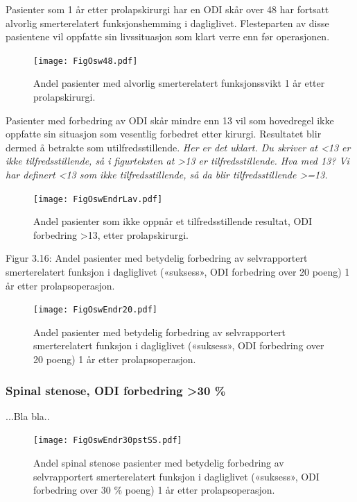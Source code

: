 \documentclass [norsk,a4paper,twoside]{article}\usepackage[]{graphicx}\usepackage[]{color}
\begin{document}

Pasienter som 1 år etter prolapskirurgi har en ODI skår over 48 har fortsatt alvorlig
smerterelatert funksjonshemming i dagliglivet. Flesteparten av disse pasientene vil
oppfatte sin livssituasjon som klart verre enn før operasjonen.
\begin{figure}[ht]
\centering \texttt{[image: FigOsw48.pdf]}
\caption{\label{fig:Osw48}  Andel pasienter med alvorlig smerterelatert funksjonssvikt 1 år etter
prolapskirurgi.}
\end{figure}

\clearpage

Pasienter med forbedring av ODI skår mindre enn 13 vil som hovedregel ikke
oppfatte sin situasjon som vesentlig forbedret etter kirurgi. Resultatet blir dermed å
betrakte som utilfredsstillende. \textit{Her er det uklart. Du skriver at <13 er ikke tilfredsstillende, så i figurteksten at >13 er tilfredsstillende. Hva med 13? Vi har definert <13 som ikke tilfredsstillende, så da blir tilfredsstillende >=13.}

\begin{figure}[ht]
\centering \texttt{[image: FigOswEndrLav.pdf]}
\caption{\label{fig:OswEndrLav}   Andel pasienter som ikke oppnår et tilfredsstillende resultat, ODI
forbedring >13, etter prolapskirurgi.}
\end{figure}



Figur 3.16: Andel pasienter med betydelig forbedring av selvrapportert
smerterelatert funksjon i dagliglivet («suksess», ODI forbedring over 20 poeng) 1 år
etter prolapsoperasjon.
\begin{figure}[ht]
\centering \texttt{[image: FigOswEndr20.pdf]}
\caption{\label{fig:OswEndr20}   Andel pasienter med betydelig forbedring av selvrapportert
smerterelatert funksjon i dagliglivet («suksess», ODI forbedring over 20 poeng) 1 år
etter prolapsoperasjon.}
\end{figure}

\subsubsection{Spinal stenose, ODI forbedring >30 \%}

...Bla bla..

\begin{figure}[ht]
\centering \texttt{[image: FigOswEndr30pstSS.pdf]}
\caption{\label{fig:OswEndr30pstSS} Andel spinal stenose pasienter med betydelig forbedring av selvrapportert
smerterelatert funksjon i dagliglivet («suksess», ODI forbedring over 30 \% poeng) 1 år
etter prolapsoperasjon.}
\end{figure}
\end{document}
